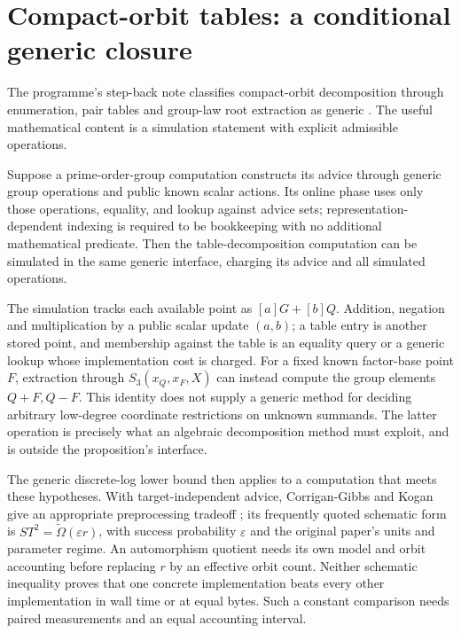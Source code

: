 \section{Compact-orbit tables: a conditional generic closure}

The programme's step-back note classifies compact-orbit decomposition
through enumeration, pair tables and group-law root extraction as generic
\cite{compactSource}. The useful mathematical content is a simulation
statement with explicit admissible operations.

\begin{proposition}
Suppose a prime-order-group computation constructs its advice through
generic group operations and public known scalar actions. Its online
phase uses only those operations, equality, and lookup against advice
sets; representation-dependent indexing is required to be bookkeeping
with no additional mathematical predicate. Then the table-decomposition
computation can be simulated in the same generic interface, charging its
advice and all simulated operations.
\end{proposition}

The simulation tracks each available point as $[a]G+[b]Q$. Addition,
negation and multiplication by a public scalar update $(a,b)$; a table
entry is another stored point, and membership against the table is an
equality query or a generic lookup whose implementation cost is charged.
For a fixed known factor-base point $F$, extraction through
$S_3(x_Q,x_F,X)$ can instead compute the group elements $Q+F,Q-F$.
This identity does not supply a generic method for deciding arbitrary
low-degree coordinate restrictions on unknown summands. The latter
operation is precisely what an algebraic decomposition method must
exploit, and is outside the proposition's interface.

The generic discrete-log lower bound \cite{shoup1997} then applies to a
computation that meets these hypotheses. With target-independent advice,
Corrigan-Gibbs and Kogan give an appropriate preprocessing tradeoff
\cite{cgk2018}; its frequently quoted schematic form is
$S T^2=\widetilde\Omega(\varepsilon r)$, with success probability
$\varepsilon$ and the original paper's units and parameter regime.
An automorphism quotient needs its own model and orbit accounting before
replacing $r$ by an effective orbit count. Neither schematic inequality
proves that one concrete implementation beats every other implementation
in wall time or at equal bytes. Such a constant comparison needs paired
measurements and an equal accounting interval.

